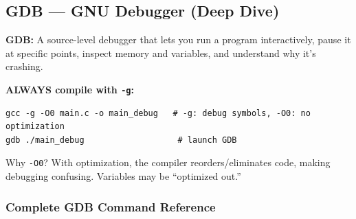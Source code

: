 \documentclass[11pt,a4paper]{article}
\newcommand{\code}[1]{\texttt{\small\colorbox{codebg}{\color{codekw}#1}}}
\begin{document}
\subsection{GDB --- GNU Debugger (Deep Dive)}

\begin{mydef}
\textbf{GDB:} A source-level debugger that lets you run a program interactively, pause it at specific points, inspect memory and variables, and understand why it's crashing.
\end{mydef}

\textbf{ALWAYS compile with \code{-g}:}
\begin{lstlisting}[style=bashstyle]
gcc -g -O0 main.c -o main_debug   # -g: debug symbols, -O0: no optimization
gdb ./main_debug                   # launch GDB
\end{lstlisting}

Why \code{-O0}? With optimization, the compiler reorders/eliminates code, making debugging confusing. Variables may be ``optimized out.''

\subsubsection{Complete GDB Command Reference}
\end{document}
